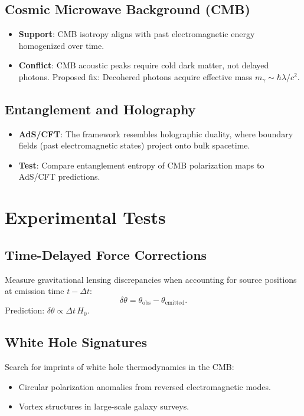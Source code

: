 \documentclass[12pt, a4paper]{article}
\begin{document}
\subsection{Cosmic Microwave Background (CMB)}
\begin{itemize}
    \item \textbf{Support}: CMB isotropy aligns with past electromagnetic energy homogenized over time.
    \item \textbf{Conflict}: CMB acoustic peaks require cold dark matter, not delayed photons. Proposed fix: Decohered photons acquire effective mass \( m_{\gamma} \sim \hbar \lambda / c^2 \).
\end{itemize}

\subsection{Entanglement and Holography}
\begin{itemize}
    \item \textbf{AdS/CFT}: The framework resembles holographic duality, where boundary fields (past electromagnetic states) project onto bulk spacetime.
    \item \textbf{Test}: Compare entanglement entropy of CMB polarization maps to AdS/CFT predictions.
\end{itemize}

\section{Experimental Tests}
\subsection{Time-Delayed Force Corrections}
Measure gravitational lensing discrepancies when accounting for source positions at emission time \( t - \Delta t \):
\[
\delta \theta = \theta_{\text{obs}} - \theta_{\text{emitted}}.
\]
Prediction: \( \delta \theta \propto \Delta t \, H_0 \).

\subsection{White Hole Signatures}
Search for imprints of white hole thermodynamics in the CMB:
\begin{itemize}
    \item Circular polarization anomalies from reversed electromagnetic modes.
    \item Vortex structures in large-scale galaxy surveys.
\end{itemize}
\end{document}
